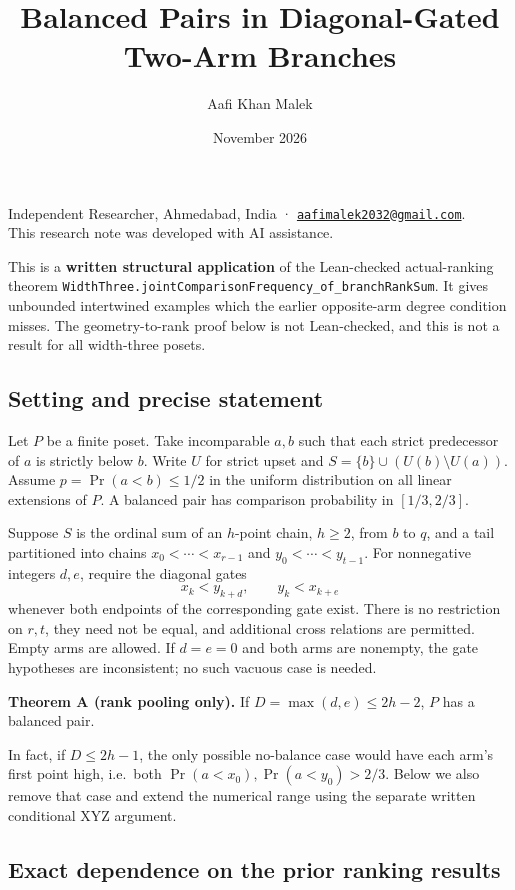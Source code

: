 \documentclass[
  11pt,
]{article}
\title{Balanced Pairs in Diagonal-Gated Two-Arm Branches}
\author{Aafi Khan Malek}
\date{November 2026}
\begin{document}
\maketitle

Independent Researcher, Ahmedabad, India ·
\href{mailto:aafimalek2032@gmail.com}{\nolinkurl{aafimalek2032@gmail.com}}.\\
This research note was developed with AI assistance.

This is a \textbf{written structural application} of the Lean-checked
actual-ranking theorem
\texttt{WidthThree.jointComparisonFrequency\_of\_branchRankSum}\allowbreak{}. It
gives unbounded intertwined examples which the earlier opposite-arm
degree condition misses. The geometry-to-rank proof below is not
Lean-checked, and this is not a result for all width-three posets.

\subsection{Setting and precise
statement}\label{setting-and-precise-statement}

Let \(P\) be a finite poset. Take incomparable \(a,b\) such that each
strict predecessor of \(a\) is strictly below \(b\). Write \(U\) for
strict upset and \(S=\{b\}\cup(U(b)\setminus U(a))\). Assume
\(p=\Pr(a<b)\le 1/2\) in the uniform distribution on all linear
extensions of \(P\). A balanced pair has comparison probability in
\([1/3,2/3]\).

Suppose \(S\) is the ordinal sum of an \(h\)-point chain, \(h\ge2\),
from \(b\) to \(q\), and a tail partitioned into chains
\(x_0<\cdots<x_{r-1}\) and \(y_0<\cdots<y_{t-1}\). For nonnegative
integers \(d,e\), require the diagonal gates \[
 x_k<y_{k+d},\qquad y_k<x_{k+e}
\] whenever both endpoints of the corresponding gate exist. There is no
restriction on \(r,t\), they need not be equal, and additional cross
relations are permitted. Empty arms are allowed. If \(d=e=0\) and both
arms are nonempty, the gate hypotheses are inconsistent; no such vacuous
case is needed.

\textbf{Theorem A (rank pooling only).} If \(D=\max(d,e)\le 2h-2\),
\(P\) has a balanced pair.

In fact, if \(D\le2h-1\), the only possible no-balance case would have
each arm's first point high, i.e.~both \(\Pr(a<x_0),\Pr(a<y_0)>2/3\).
Below we also remove that case and extend the numerical range using the
separate written conditional XYZ argument.

\subsection{Exact dependence on the prior ranking
results}\label{exact-dependence-on-the-prior-ranking-results}
\end{document}
